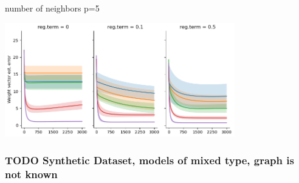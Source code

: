 \documentclass{article}
\begin{document}
\vspace{5mm}
number of neighbors p=5
\vspace{5mm}

\includegraphics[width=10cm]{linreg_no_G_nneib_5.png}

\subsubsection{ TODO Synthetic Dataset, models of mixed type, graph is not known}
\end{document}
